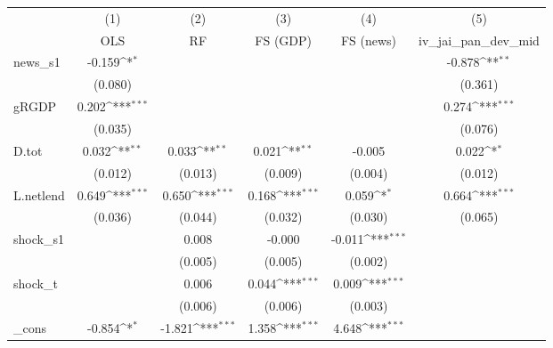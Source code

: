 {
\def\sym#1{\ifmmode^{#1}\else\(^{#1}\)\fi}
\begin{tabular}{l*{5}{c}}
\toprule
            &\multicolumn{1}{c}{(1)}&\multicolumn{1}{c}{(2)}&\multicolumn{1}{c}{(3)}&\multicolumn{1}{c}{(4)}&\multicolumn{1}{c}{(5)}\\
            &\multicolumn{1}{c}{OLS}&\multicolumn{1}{c}{RF}&\multicolumn{1}{c}{FS (GDP)}&\multicolumn{1}{c}{FS (news)}&\multicolumn{1}{c}{iv\_jai\_pan\_dev\_mid}\\
\midrule
news\_s1     &      -0.159\sym{*}  &                     &                     &                     &      -0.878\sym{**} \\
            &     (0.080)         &                     &                     &                     &     (0.361)         \\
\addlinespace
gRGDP       &       0.202\sym{***}&                     &                     &                     &       0.274\sym{***}\\
            &     (0.035)         &                     &                     &                     &     (0.076)         \\
\addlinespace
D.tot       &       0.032\sym{**} &       0.033\sym{**} &       0.021\sym{**} &      -0.005         &       0.022\sym{*}  \\
            &     (0.012)         &     (0.013)         &     (0.009)         &     (0.004)         &     (0.012)         \\
\addlinespace
L.netlend   &       0.649\sym{***}&       0.650\sym{***}&       0.168\sym{***}&       0.059\sym{*}  &       0.664\sym{***}\\
            &     (0.036)         &     (0.044)         &     (0.032)         &     (0.030)         &     (0.065)         \\
\addlinespace
shock\_s1    &                     &       0.008         &      -0.000         &      -0.011\sym{***}&                     \\
            &                     &     (0.005)         &     (0.005)         &     (0.002)         &                     \\
\addlinespace
shock\_t     &                     &       0.006         &       0.044\sym{***}&       0.009\sym{***}&                     \\
            &                     &     (0.006)         &     (0.006)         &     (0.003)         &                     \\
\addlinespace
\_cons      &      -0.854\sym{*}  &      -1.821\sym{***}&       1.358\sym{***}&       4.648\sym{***}&                     \\

\end{tabular}}
